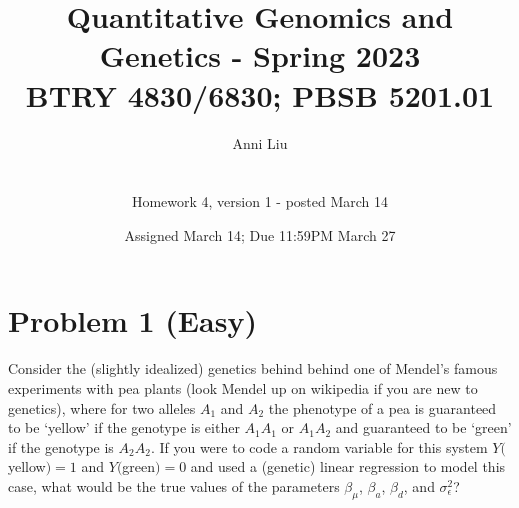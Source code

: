 \documentclass[letterpaper, 11pt]{article}
\title{Quantitative Genomics and Genetics - Spring 2023 \\
BTRY 4830/6830; PBSB 5201.01}
\author{Anni Liu \\ \\ \\ Homework 4, version 1 - posted March 14  }
\date{Assigned March 14; Due 11:59PM March 27}                                           %
\begin{document}
\vspace{-20in}

\maketitle
\section*{Problem 1 (Easy)}

Consider the (slightly idealized) genetics behind behind one of Mendel's famous experiments with pea plants (look Mendel up on wikipedia if you are new to genetics), where for two alleles $A_1$ and $A_2$ the phenotype of a pea is guaranteed to be `yellow' if the genotype is either $A_1A_1$ or $A_1A_2$ and guaranteed to be `green' if the genotype is $A_2A_2$.  If you were to code a random variable for this system $Y($yellow$) = 1$ and $Y($green$) = 0$ and used a (genetic) linear regression to model this case, what would be the true values of the parameters $\beta_\mu$, $\beta_a$, $\beta_d$, and $\sigma^2_\epsilon$? \\
\end{document}
